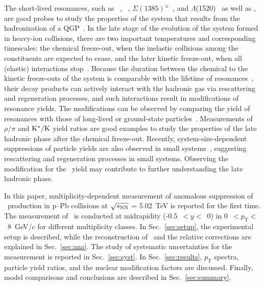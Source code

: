 The short-lived resonances, such as \rhoz~\cite{ALICE:2018qdv}, \kstar~\cite{ALICE:2019etb, ALICE:2016sak}, $\Sigma(1385)^{\pm}$~\cite{ALICE:2022zuc}, and $\Lambda$(1520)~\cite{ALICE:2018ewo} as well as \fzero, are good probes to study the properties of the system that results from the hadronization of a QGP~\cite{Bierlich:2021poz}. In the late stage of the evolution of the system formed in heavy-ion collisions, there are two important temperatures and corresponding timescales: the chemical freeze-out, when the inelastic collisions among the constituents are expected to cease, and the later kinetic freeze-out, when all (elastic) interactions stop~\cite{Song:1996ik}. Because the duration between the chemical to the kinetic freeze-outs of the system is comparable with the lifetime of resonances~\cite{ALICE:2011dyt, ALICE:2019xyr}, their decay products can actively interact with the hadronic gas via rescattering and regeneration processes, and such interactions result in modifications of resonance yields. The modifications can be observed by comparing the yield of resonances with those of long-lived or ground-state particles~\cite{ALICE:2018pal}. Measurements of $\rho/\pi$ and $\rm{}K^{*}/K$ yield ratios are good examples to study the properties of the late hadronic phase after the chemical freeze-out. Recently, system-size-dependent suppressions of particle yields are also observed in small systems~\cite{ALICE:2019etb}, suggesting rescattering and regeneration processes in small systems. Observing the modification for the \fzero~yield may contribute to further understanding the late hadronic phase.

In this paper, multiplicity-dependent measurement of anomalous suppression of \fzero~production in p--Pb collisions at $\sqrt{s_{\rm NN}}$ = 5.02~TeV is reported for the first time. The measurement of \fzero~is conducted at midrapidity (-0.5~$<y<$~0) in 0~$<p_{\mathrm{T}}<$~8~GeV/$c$ for different multiplicity classes. In Sec.~\ref{sec:setup}, the experimental setup is described, while the reconstruction of \fzero\ and the relative corrections are explained in Sec.~\ref{sec:ana}. The study of systematic uncertainties for the measurement is reported in Sec.~\ref{sec:syst}. In Sec.~\ref{sec:results}, $p_{\mathrm{T}}$ spectra, particle yield ratios, and the nuclear modification factors are discussed. Finally, model comparisons and conclusions are described in Sec.~\ref{sec:summary}.

\label{sec:intro}



